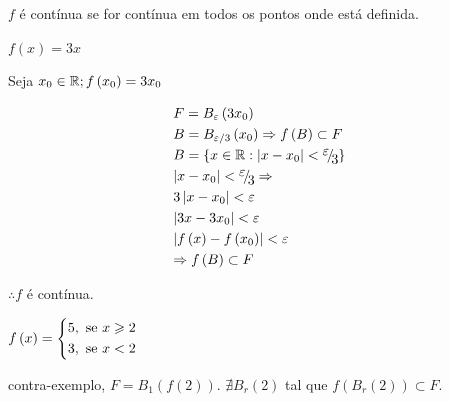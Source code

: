 \documentclass{book}
\begin{document}
\begin{defn}
$f$ \'e cont\'inua se for cont\'inua em todos os pontos onde est\'a definida.
\end{defn}

\begin{ex}
$f(x) = 3x$
\end{ex}

\begin{sol}
Seja $x_0  \in \mathbb{R};f\left( {x_0 } \right) = 3x_0$

\[
\begin{gathered}
F = B_\varepsilon  \left( {3x_0 } \right) \hfill \\
B = B_{\varepsilon /3} \left( {x_0 } \right) \Rightarrow f\left( B \right) \subset F \hfill \\
B = \left\{ {x \in \R:\left| {x - x_0 } \right| < {\raise0.7ex\hbox{$\varepsilon $} \!\mathord{\left/
{\vphantom {\varepsilon  3}}\right.\kern-\nulldelimiterspace}
\!\lower0.7ex\hbox{$3$}}} \right\} \hfill \\
\left| {x - x_0 } \right| < {\raise0.7ex\hbox{$\varepsilon $} \!\mathord{\left/
{\vphantom {\varepsilon  3}}\right.\kern-\nulldelimiterspace}
\!\lower0.7ex\hbox{$3$}} \Rightarrow  \hfill \\
3\left| {x - x_0 } \right| < \varepsilon  \hfill \\
\left| {3x - 3x_0 } \right| < \varepsilon  \hfill \\
\left| {f\left( x \right) - f\left( {x_0 } \right)} \right| < \varepsilon  \hfill \\
\Rightarrow f\left( B \right) \subset F \hfill \\
\end{gathered}
\]

$\therefore f$ \'e cont\'inua.
\end{sol}

\begin{ex}
$f\left( x \right) = \left\{ \begin{gathered}
5,{\text{ se }}x \geqslant 2 \hfill \\
3,{\text{ se }}x < 2 \hfill \\
\end{gathered}  \right.$

\end{ex}


\begin{sol}
contra-exemplo, $F = B_1 \left( {f\left( 2 \right)} \right)$. $\nexists B_r \left( 2 \right)$ tal que $f\left( {B_r \left( 2 \right)} \right) \subset F$.
\end{sol}
\end{document}
